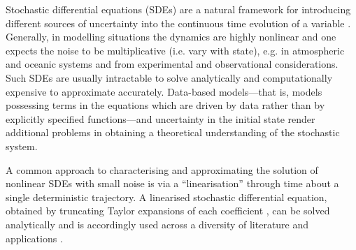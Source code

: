 Stochastic differential equations (SDEs) are a natural framework for introducing different sources of uncertainty %
into the continuous time evolution of a variable \cite{Oksendal_2003_StochasticDifferentialEquations,SarkkaSolin_2019_AppliedStochasticDifferential,KallianpurSundar_2014_StochasticAnalysisDiffusion}.
Generally, in modelling situations the dynamics are highly nonlinear and one expects the noise to be multiplicative (i.e. vary with state), e.g. in atmospheric \cite{SuraEtAl_2005_MultiplicativeNoiseNonGaussianity,Sura_2003_StochasticAnalysisSouthern} and oceanic \cite{KamenkovichEtAl_2015_PropertiesOriginsAnisotropic} systems and from experimental and observational considerations.
Such SDEs are usually intractable to solve analytically and computationally expensive to approximate accurately.
Data-based models---that is, models possessing terms in the equations which are driven by data rather than by explicitly specified functions---and uncertainty in the initial state render additional problems in obtaining a theoretical understanding of the stochastic system.

A common approach to characterising and approximating the solution of nonlinear SDEs with small noise is via a ``linearisation'' through time about a single deterministic trajectory.
A linearised stochastic differential equation, obtained by truncating Taylor expansions of each coefficient \cite[e.g.]{Jazwinski_2014_StochasticProcessesFiltering,Blagoveshchenskii_1962_DiffusionProcessesDepending}, can be solved analytically and is accordingly used across a diversity of literature and applications \cite{Jazwinski_2014_StochasticProcessesFiltering,SarkkaSolin_2019_AppliedStochasticDifferential,KaszasHaller_2020_UniversalUpperEstimate,ArchambeauEtAl_2007_GaussianProcessApproximations,Sanz-AlonsoStuart_2017_GaussianApproximationsSmall,LawEtAl_2015_DataAssimilationMathematical,ReichCotter_2015_ProbabilisticForecastingBayesian,BudhirajaEtAl_2019_AssimilatingDataModels}.

